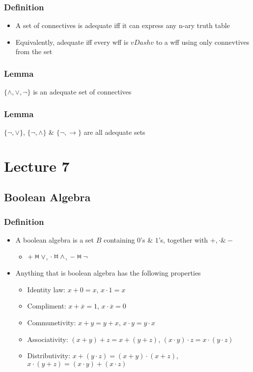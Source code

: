 \documentclass[11pt]{article}
\newcommand{\vDashv}{%
  \mathrel{%
    \text{%
      \ooalign{$\vDash$\cr\reflectbox{$\vDash$}\cr}%
    }%
  }%
}
\begin{document}
\subsubsection{Definition}
\begin{itemize}
    \item A set of connectives is adequate iff it can express any n-ary truth table 
    \item Equivalently, adequate iff every wff is $vDashv$ to a wff using only connevtives from the set 
\end{itemize}
\subsubsection{Lemma}
$\{\land, \lor, \neg\}$ is an adequate set of connectives 
\subsubsection{Lemma}
$\{\neg, \lor\}$, $\{\neg, \land\}$ \& $\{\neg, \rightarrow\}$ are all adequate sets 

\section{Lecture 7}
\subsection{Boolean Algebra}
\subsubsection{Definition}
\begin{itemize}
    \item A boolean algebra is a set $B$ containing $0$'s \& $1$'s, together with $+, \cdot \& -$
    \begin{itemize}
        \item $+\vDashv\lor$, $\cdot\vDashv\land$, $-\vDashv\neg$
    \end{itemize}
    \item Anything that is boolean algebra has the following properties 
    \begin{itemize}
        \item Identity law: $x+0=x$, $x\cdot1=x$
        \item Compliment: $x+\overline{x} = 1$, $x\cdot\overline{x}=0$
        \item Communetivity: $x+y = y+x$, $x\cdot y= y\cdot x$
        \item Associativity: $(x+y)+z = x+(y+z)$, $(x\cdot y)\cdot z = x\cdot(y\cdot z)$
        \item Distributivity: $x+(y\cdot z) = (x+y)\cdot(x+z)$, $x\cdot(y+z) = (x\cdot y)+(x\cdot z)$
    \end{itemize}
\end{itemize}
\end{document}
